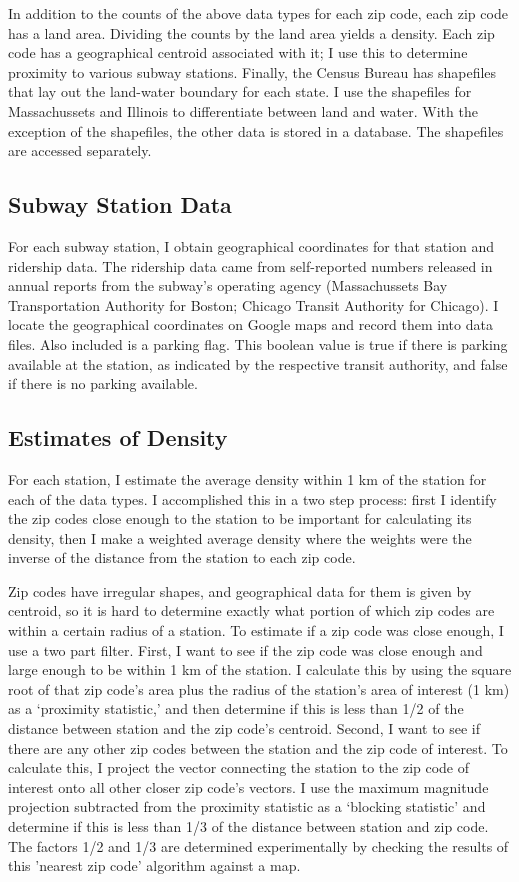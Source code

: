 \documentclass{article}
\begin{document}
In addition to the counts of the above data types for each zip code, each zip code has a land area. Dividing the counts by the land area yields a density. Each zip code has a geographical centroid associated with it; I use this to determine proximity to various subway stations. Finally, the Census Bureau has shapefiles that lay out the land-water boundary for each state. I use the shapefiles for Massachussets and Illinois to differentiate between land and water. With the exception of the shapefiles, the other data is stored in a database. The shapefiles are accessed separately.

\subsection{Subway Station Data}

For each subway station, I obtain geographical coordinates for that station and ridership data. The ridership data came from self-reported numbers released in annual reports from the subway's operating agency (Massachussets Bay Transportation Authority for Boston; Chicago Transit Authority for Chicago). I locate the geographical coordinates on Google maps and record them into data files. Also included is a parking flag. This boolean value is true if there is parking available at the station, as indicated by the respective transit authority, and false if there is no parking available.

\subsection{Estimates of Density}

For each station, I estimate the average density within 1 km of the station for each of the data types. I accomplished this in a two step process: first I identify the zip codes close enough to the station to be important for calculating its density, then I make a weighted average density where the weights were the inverse of the distance from the station to each zip code.

Zip codes have irregular shapes, and geographical data for them is given by centroid, so it is hard to determine exactly what portion of which zip codes are within a certain radius of a station. To estimate if a zip code was close enough, I use a two part filter. First, I want to see if the zip code was close enough and large enough to be within 1 km of the station. I calculate this by using the square root of that zip code's area plus the radius of the station's area of interest (1 km) as a `proximity statistic,' and then determine if this is less than 1/2 of the distance between station and the zip code's centroid. Second, I want to see if there are any other zip codes between the station and the zip code of interest. To calculate this, I project the vector connecting the station to the zip code of interest onto all other closer zip code's vectors. I use the maximum magnitude projection subtracted from the proximity statistic as a `blocking statistic' and determine if this is less than 1/3 of the distance between station and zip code. The factors 1/2 and 1/3 are determined experimentally by checking the results of this 'nearest zip code' algorithm against a map.
\end{document}
